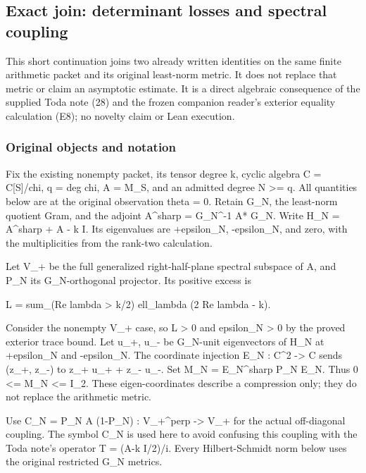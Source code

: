 \subsection{Exact join: determinant losses and spectral
coupling}\label{toda_parent_join:exact-join-determinant-losses-and-spectral-coupling}

This short continuation joins two already written identities on the same finite arithmetic packet
and its original least-norm metric. It does not replace that metric or claim an asymptotic estimate.
It is a direct algebraic consequence of the supplied Toda note (28) and the frozen companion
reader's exterior equality calculation (E8); no novelty claim or Lean execution.

\subsubsection{Original objects and notation}\label{toda_parent_join:original-objects-and-notation}

Fix the existing nonempty packet, its tensor degree k, cyclic algebra C = C{[}S{]}/chi, q = deg chi,
A = M\_S, and an admitted degree N \textgreater= q. All quantities below are at the original
observation theta = 0. Retain G\_N, the least-norm quotient Gram, and the adjoint A\^{}sharp =
G\_N\^{}-1 A* G\_N. Write H\_N = A\^{}sharp + A - k I. Its eigenvalues are +epsilon\_N, -epsilon\_N,
and zero, with the multiplicities from the rank-two calculation.

Let V\_+ be the full generalized right-half-plane spectral subspace of A, and P\_N its
G\_N-orthogonal projector. Its positive excess is

L = sum\_(Re lambda \textgreater{} k/2) ell\_lambda (2 Re lambda - k).

Consider the nonempty V\_+ case, so L \textgreater{} 0 and epsilon\_N \textgreater{} 0 by the proved
exterior trace bound. Let u\_+, u\_- be G\_N-unit eigenvectors of H\_N at +epsilon\_N and
-epsilon\_N. The coordinate injection E\_N : C\^{}2 -\textgreater{} C sends (z\_+, z\_-) to z\_+
u\_+ + z\_- u\_-. Set M\_N = E\_N\^{}sharp P\_N E\_N. Thus 0 \textless= M\_N \textless= I\_2. These
eigen-coordinates describe a compression only; they do not replace the arithmetic metric.

Use C\_N = P\_N A (1-P\_N) : V\_+\^{}perp -\textgreater{} V\_+ for the actual off-diagonal coupling.
The symbol C\_N is used here to avoid confusing this coupling with the Toda note's operator T = (A-k
I/2)/i. Every Hilbert-Schmidt norm below uses the original restricted G\_N metrics.


